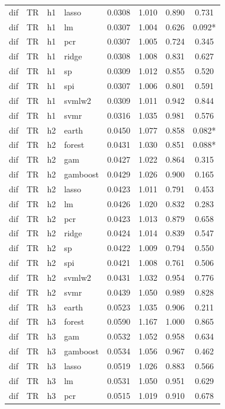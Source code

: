\begin{ThreePartTable}
\begin{longtable}[t]{llclcccc}
dif & TR & h1 & lasso & 0.0308 & 1.010 & 0.890 & 0.731\\
dif & TR & h1 & lm & 0.0307 & 1.004 & 0.626 & 0.092*\\
dif & TR & h1 & pcr & 0.0307 & 1.005 & 0.724 & 0.345\\
dif & TR & h1 & ridge & 0.0308 & 1.008 & 0.831 & 0.627\\
dif & TR & h1 & sp & 0.0309 & 1.012 & 0.855 & 0.520\\
dif & TR & h1 & spi & 0.0307 & 1.006 & 0.801 & 0.591\\
dif & TR & h1 & svmlw2 & 0.0309 & 1.011 & 0.942 & 0.844\\
dif & TR & h1 & svmr & 0.0316 & 1.035 & 0.981 & 0.576\\
\addlinespace
dif & TR & h2 & earth & 0.0450 & 1.077 & 0.858 & 0.082*\\
dif & TR & h2 & forest & 0.0431 & 1.030 & 0.851 & 0.088*\\
dif & TR & h2 & gam & 0.0427 & 1.022 & 0.864 & 0.315\\
dif & TR & h2 & gamboost & 0.0429 & 1.026 & 0.900 & 0.165\\
dif & TR & h2 & lasso & 0.0423 & 1.011 & 0.791 & 0.453\\
dif & TR & h2 & lm & 0.0426 & 1.020 & 0.832 & 0.283\\
dif & TR & h2 & pcr & 0.0423 & 1.013 & 0.879 & 0.658\\
dif & TR & h2 & ridge & 0.0424 & 1.014 & 0.839 & 0.547\\
dif & TR & h2 & sp & 0.0422 & 1.009 & 0.794 & 0.550\\
dif & TR & h2 & spi & 0.0421 & 1.008 & 0.761 & 0.506\\
dif & TR & h2 & svmlw2 & 0.0431 & 1.032 & 0.954 & 0.776\\
dif & TR & h2 & svmr & 0.0439 & 1.050 & 0.989 & 0.828\\
\addlinespace
dif & TR & h3 & earth & 0.0523 & 1.035 & 0.906 & 0.211\\
dif & TR & h3 & forest & 0.0590 & 1.167 & 1.000 & 0.865\\
dif & TR & h3 & gam & 0.0532 & 1.052 & 0.958 & 0.634\\
dif & TR & h3 & gamboost & 0.0534 & 1.056 & 0.967 & 0.462\\
dif & TR & h3 & lasso & 0.0519 & 1.026 & 0.883 & 0.566\\
dif & TR & h3 & lm & 0.0531 & 1.050 & 0.951 & 0.629\\
dif & TR & h3 & pcr & 0.0515 & 1.019 & 0.910 & 0.678\\

\end{longtable}
\end{ThreePartTable}
